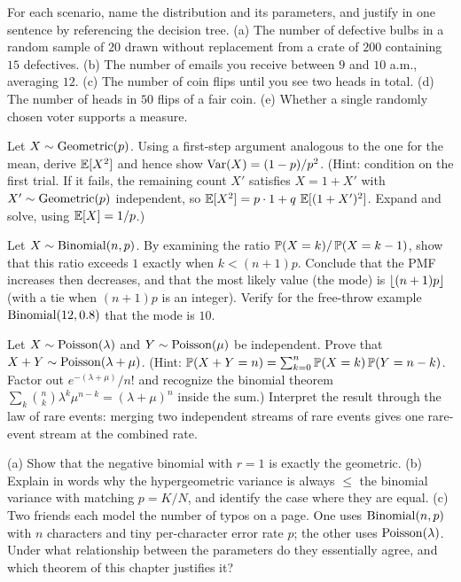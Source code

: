 \begin{exercise}
\label{ch07:exr-which}
For each scenario, name the distribution and its parameters, and justify in one
sentence by referencing the decision tree.
(a) The number of defective bulbs in a random sample of $20$ drawn without
replacement from a crate of $200$ containing $15$ defectives.
(b) The number of emails you receive between $9$ and $10$ a.m., averaging $12$.
(c) The number of coin flips until you see two heads in total.
(d) The number of heads in $50$ flips of a fair coin.
(e) Whether a single randomly chosen voter supports a measure.
\end{exercise}

\begin{exercise}
\label{ch07:exr-geomvar}
Let $X \sim \Geom(p)$. Using a first-step argument analogous to the one for the
mean, derive $\E[X^2]$ and hence show $\Var(X) = (1-p)/p^2$.
(Hint: condition on the first trial. If it fails, the remaining count $X'$
satisfies $X = 1 + X'$ with $X' \sim \Geom(p)$ independent, so
$\E[X^2] = p\cdot 1 + q\,\E[(1+X')^2]$. Expand and solve, using $\E[X] = 1/p$.)
\end{exercise}

\begin{exercise}
\label{ch07:exr-binommode}
Let $X \sim \Bin(n,p)$. By examining the ratio $\P(X=k)/\P(X=k-1)$, show
that this ratio exceeds $1$ exactly when $k < (n+1)p$. Conclude that the PMF increases then decreases, and that the most
likely value (the mode) is $\floor{(n+1)p}$ (with a tie when $(n+1)p$ is an
integer). Verify for the free-throw example $\Bin(12, 0.8)$ that the mode is $10$.
\end{exercise}

\begin{exercise}
\label{ch07:exr-poissum}
Let $X \sim \Pois(\lambda)$ and $Y \sim \Pois(\mu)$ be independent. Prove that
$X + Y \sim \Pois(\lambda + \mu)$.
(Hint: $\P(X+Y = n) = \sum_{k=0}^{n}\P(X=k)\P(Y=n-k)$. Factor out
$e^{-(\lambda+\mu)}/n!$ and recognize the binomial theorem
$\sum_k \binom{n}{k}\lambda^k\mu^{n-k} = (\lambda+\mu)^n$ inside the sum.)
Interpret the result through the law of rare events: merging two independent
streams of rare events gives one rare-event stream at the combined rate.
\end{exercise}

\begin{exercise}
\label{ch07:exr-connect}
(a) Show that the negative binomial with $r=1$ is exactly the geometric.
(b) Explain in words why the hypergeometric variance is always $\le$ the binomial
variance with matching $p = K/N$, and identify the case where they are equal.
(c) Two friends each model the number of typos on a page. One uses $\Bin(n,p)$
with $n$ characters and tiny per-character error rate $p$; the other uses
$\Pois(\lambda)$. Under what relationship between the parameters do they
essentially agree, and which theorem of this chapter justifies it?
\end{exercise}
